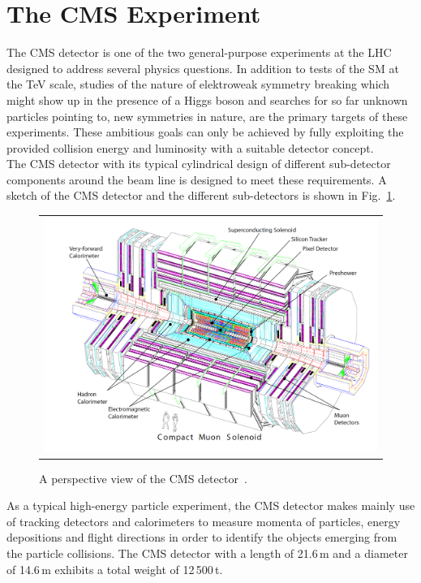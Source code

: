 \section{The CMS Experiment}
\label{sec:cms}
The CMS detector is one of the two general-purpose experiments at the LHC designed to address several physics questions. In addition to tests of the SM at the TeV scale, studies of the nature of elektroweak symmetry breaking which might show up in the presence of a Higgs boson and searches for so far unknown particles pointing to, \eg new symmetries in nature, are the primary targets of these experiments. These ambitious goals can only be achieved by fully exploiting the provided collision energy and luminosity with a suitable detector concept.\\
The CMS detector with its typical cylindrical design of different sub-detector components around the beam line is designed to meet these requirements. A sketch of the CMS detector and the different sub-detectors is shown in Fig.~\ref{fig:CMS}.
\begin{figure}[!tp]
  \centering
  \begin{tabular}{c}
    \includegraphics[width=1.0\textwidth]{figures/Figures_Experimental_Apparatus_CMS_perspective.png}
  \end{tabular}
  \caption{A perspective view of the CMS detector~\cite{Chatrchyan:2008zzk}.}
  \label{fig:CMS}
\end{figure}
As a typical high-energy particle experiment, the CMS detector makes mainly use of tracking detectors and calorimeters to measure momenta of particles, energy depositions and flight directions in order to identify the objects emerging from the particle collisions. The CMS detector with a length of 21.6\,m and a diameter of 14.6\,m exhibits a total weight of 12\,500\,t. \\  
